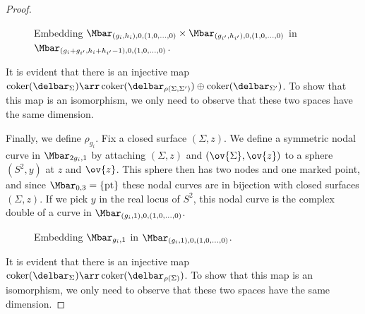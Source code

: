 \begin{lemma}
\begin{proof}
\begin{figure}[ht]
\caption{Embedding $\Mbar_{(g_i,h_i),0,(1,0,\ldots,0)} \times \Mbar_{(g_{i'},h_{i'}),0,(1,0,\ldots,0)}$ in $\Mbar_{(g_i+g_{i'},h_i+h_{i'}-1),0,(1,0,\ldots,0)}$.}
\end{figure}

It is evident that there is an injective map $\coker(\delbar_{\Sigma}) \arr \coker(\delbar_{\rho(\Sigma,\Sigma')}) \oplus \coker(\delbar_{\Sigma'})$. To show that this map is an isomorphism, we only need to observe that these two spaces have the same dimension.

Finally, we define $\rho_{g_i}$. Fix a closed surface $(\Sigma,z)$. We define a symmetric nodal curve in $\Mbar_{2g_i,1}$ by attaching $(\Sigma,z)$ and $(\ov{\Sigma},\ov{z})$ to a sphere $(S^2,y)$ at $z$ and $\ov{z}$. This sphere then has two nodes and one marked point, and since $\Mbar_{0,3}=\{\text{pt}\}$ these nodal curves are in bijection with closed surfaces $(\Sigma,z)$. If we pick $y$ in the real locus of $S^2$, this nodal curve is the complex double of a curve in $\Mbar_{(g_{i},1),0,(1,0,\ldots,0)}$.
\begin{figure}[ht]
\centering
{}
\caption{Embedding $\Mbar_{g_i,1}$ in $\Mbar_{(g_{i},1),0,(1,0,\ldots,0)}$.}
\end{figure}

It is evident that there is an injective map $\coker(\delbar_{\Sigma}) \arr \coker(\delbar_{\rho(\Sigma)})$. To show that this map is an isomorphism, we only need to observe that these two spaces have the same dimension.
\end{proof}
\end{lemma}

